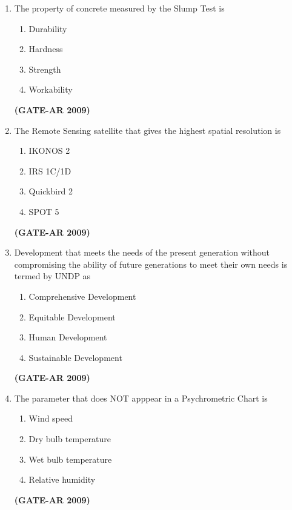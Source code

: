 \documentclass[a4paper,10pt]{article}
\begin{document}
\begin{enumerate}
    \item The property of concrete measured by the Slump Test is 
    \begin{multicols}{4}
	\begin{enumerate}
        \item Durability
        \item Hardness
        \item Strength
        \item Workability
    \end{enumerate}
	\end{multicols}
    \hfill \textbf{(GATE-AR 2009)}
    
    \item The Remote Sensing satellite that gives the highest spatial resolution is 
    \begin{multicols}{4}
	\begin{enumerate}
        \item IKONOS 2
        \item IRS 1C/1D
        \item Quickbird 2
        \item SPOT 5
    \end{enumerate}
	\end{multicols}
    \hfill \textbf{(GATE-AR 2009)}
    
    \item Development that meets the needs of the present generation without compromising the ability of future generations to meet their own needs is termed by UNDP as 
    \begin{multicols}{2}
	\begin{enumerate}
        \item Comprehensive Development
        \item Equitable Development
        \item Human Development
        \item Sustainable Development
    \end{enumerate}
	\end{multicols}
    \hfill \textbf{(GATE-AR 2009)}

	\item The parameter that does NOT apppear in a Psychrometric Chart is 
    \begin{multicols}{2}
	\begin{enumerate}
        \item Wind speed
        \item Dry bulb temperature
        \item Wet bulb temperature
        \item Relative humidity
    \end{enumerate}
	\end{multicols}
    \hfill \textbf{(GATE-AR 2009)}


\end{enumerate}
\end{document}
